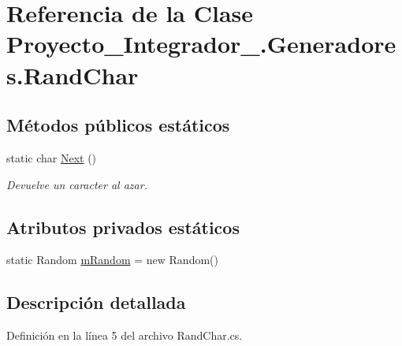 \hypertarget{class_proyecto___integrador__3_1_1_generadores_1_1_rand_char}{\section{Referencia de la Clase Proyecto\-\_\-\-Integrador\-\_.\-Generadores.\-Rand\-Char}
\label{class_proyecto___integrador__3_1_1_generadores_1_1_rand_char}
}
\subsection*{Métodos públicos estáticos}
\begin{DoxyCompactItemize}
\item 
static char \hyperlink{class_proyecto___integrador__3_1_1_generadores_1_1_rand_char_a10b8b5e4415542c4edcfe5ffc3f93f31}{Next} ()
\begin{DoxyCompactList}\small\item\em Devuelve un caracter al azar. \end{DoxyCompactList}\end{DoxyCompactItemize}
\subsection*{Atributos privados estáticos}
\begin{DoxyCompactItemize}
\item 
static Random \hyperlink{class_proyecto___integrador__3_1_1_generadores_1_1_rand_char_adffe3586409f4c532130cf3559ac25d9}{m\-Random} = new Random()
\end{DoxyCompactItemize}


\subsection{Descripción detallada}


Definición en la línea 5 del archivo Rand\-Char.\-cs.



